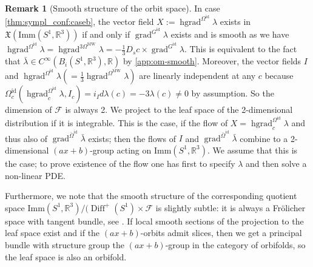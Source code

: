 \documentclass[12pt]{amsart}
\newcommand{\rev}[1]{#1}
\theoremstyle{definition}
\newtheorem{remark}[theorem]{Remark}
\newcommand{\R}{\mathbb R}
\newcommand{\Diffp}{\operatorname{Diff}^+(S^1)}
\newcommand{\id}{\mathrm{id}}
\newcommand{\Imm}{\mathrm{Imm}}
\newcommand{\OmMW}{\Omega^{\operatorname{MW}}}
\def\la{\lambda}
\def\Om{\Omega}
\def\x{\times}
\def\X{{\mathfrak X}}
\def\R{{\mathbb R}}
\let\on=\operatorname
\begin{document}
\begin{remark}[\rev{Smooth structure of the orbit space}] 
In case \ref{thm:sympl_conf:caseb}, 
the vector field $X:=\on{hgrad}^{\Om^\id}\la$ exists in $\X(\Imm(S^1,\R^3))$ if and only if  $\on{grad}^{G^{\on{id}}}\la$ exists and is smooth as we have $\on{hgrad}^{\Om^{\on{id}}}\la = \on{hgrad}^{3\OmMW}\la= -\frac{1}{3}D_s c \x \on{grad}^{G^\id}\la$. This is equivalent to the fact that $\bar\la\in C^\infty(B_i(S^1,\mathbb R^3),\mathbb R)$ by \ref{app:om-smooth}.
Moreover, the vector fields $I$ and 
$\on{hgrad}^{\Om^\id}\la(=\frac{1}{3}\on{hgrad}^{\OmMW}\la)$ are linearly independent at any $c$
because $\Om^{\id}_c(\on{hgrad}^{\Om^\id}_c\la, I_c) = i_I d\la(c) = -3\la(c) \ne 0$ by  assumption.   So the dimension of $\mathcal F$ is always 2.
We project to the leaf space of the 2-dimensional distribution if it is integrable. This is the case, if the flow of \rev{$X=\on{hgrad}^{\Om^\id}_c\la$ and thus also of} $\on{grad}^{\bar\Om^\id}\bar\la$ exists; then the flows of $I$ and $\on{grad}^{\bar\Om^\id}\bar\la$ combine to a 2-dimensional $(ax+b)$-group acting on $\Imm(S^1,\R^3)$. We assume that this is the case; to prove existence of the flow one has first to specify $\la$ and then solve a non-linear PDE. 

\rev{Furthermore, we note that the smooth structure of the corresponding quotient space $\Imm(S^1,\mathbb R^3)/(\Diffp \x \mathcal F$ is slightly subtle: it is always a Fr\"olicher space with  tangent bundle, see \cite[Section 23]{kriegl_michor_1997convenient}. If local smooth sections of the projection to the leaf space exist and if the $(ax+b)$-orbits admit slices, then we get a principal bundle with structure group the $(ax+b)$-group in the category of orbifolds, so the leaf space is also an orbifold.}
\end{remark}
\end{document}
